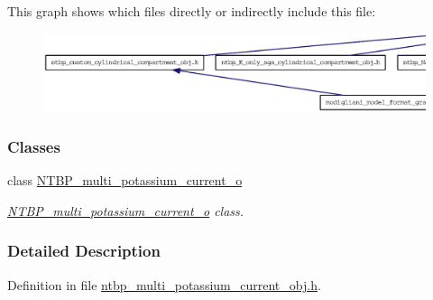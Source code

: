 This graph shows which files directly or indirectly include this file:
\nopagebreak
\begin{figure}[H]
\begin{center}
\leavevmode
\includegraphics[width=400pt]{ntbp__multi__potassium__current__obj_8h__dep__incl}
\end{center}
\end{figure}
\subsubsection*{Classes}
\begin{DoxyCompactItemize}
\item 
class \hyperlink{class_n_t_b_p__multi__potassium__current__o}{NTBP\_\-multi\_\-potassium\_\-current\_\-o}
\begin{DoxyCompactList}\small\item\em \hyperlink{class_n_t_b_p__multi__potassium__current__o}{NTBP\_\-multi\_\-potassium\_\-current\_\-o} class. \item\end{DoxyCompactList}\end{DoxyCompactItemize}


\subsubsection{Detailed Description}


Definition in file \hyperlink{ntbp__multi__potassium__current__obj_8h_source}{ntbp\_\-multi\_\-potassium\_\-current\_\-obj.h}.

